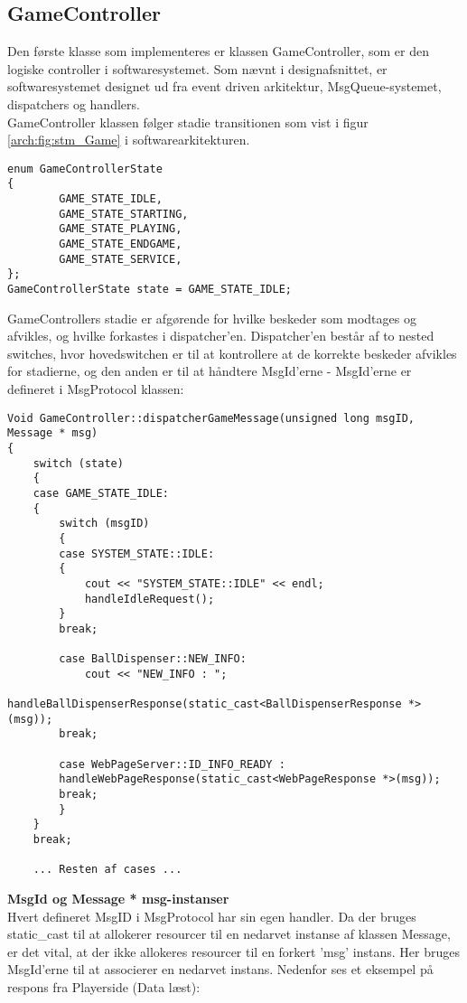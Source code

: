 \documentclass[Softwaredesign/Softwaredesign_main.tex]{subfiles}
\begin{document}
\subsection{GameController}
Den første klasse som implementeres er klassen GameController, som er den logiske controller i softwaresystemet. Som nævnt i designafsnittet, er softwaresystemet designet ud fra event driven arkitektur, MsgQueue-systemet, dispatchers og handlers. \\
GameController klassen følger stadie transitionen som vist i figur \ref{arch:fig:stm_Game} i softwarearkitekturen. 
\begin{lstlisting}[caption={Enumeration stadier for GameController}, label=list:Game_State]
enum GameControllerState
{
		GAME_STATE_IDLE,
		GAME_STATE_STARTING,
		GAME_STATE_PLAYING,
		GAME_STATE_ENDGAME,
		GAME_STATE_SERVICE,
};
GameControllerState state = GAME_STATE_IDLE;
\end{lstlisting}
GameControllers stadie er afgørende for hvilke beskeder som modtages og afvikles, og hvilke forkastes i dispatcher'en. Dispatcher'en består af to nested switches, hvor hovedswitchen er til at kontrollere at de korrekte beskeder afvikles for stadierne, og den anden er til at håndtere MsgId'erne - MsgId'erne er defineret i MsgProtocol klassen: 
\begin{lstlisting}[caption={Dispatcher for GameController}, label=list:Disp_Game]
Void GameController::dispatcherGameMessage(unsigned long msgID, Message * msg)
{
    switch (state)
	{
	case GAME_STATE_IDLE:
	{
		switch (msgID)
		{
		case SYSTEM_STATE::IDLE:
		{
			cout << "SYSTEM_STATE::IDLE" << endl;
			handleIdleRequest();
		}
		break;

		case BallDispenser::NEW_INFO:
			cout << "NEW_INFO : ";
			handleBallDispenserResponse(static_cast<BallDispenserResponse *>(msg));
		break;

		case WebPageServer::ID_INFO_READY :
		handleWebPageResponse(static_cast<WebPageResponse *>(msg));
		break;
		}
	}
	break;
	
	... Resten af cases ... 
\end{lstlisting}
\textbf{MsgId og Message * msg-instanser}\\
Hvert defineret MsgID i MsgProtocol har sin egen handler. Da der bruges static\_cast til at allokerer resourcer til en nedarvet instanse af klassen Message, er det vital, at der ikke allokeres resourcer til en forkert 'msg' instans. Her bruges MsgId'erne til at associerer en nedarvet instans. Nedenfor ses et eksempel på respons fra Playerside (Data læst): 
\end{document}

